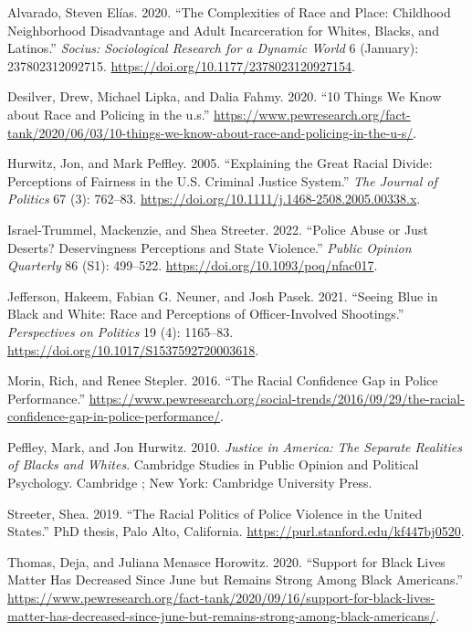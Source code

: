 \documentclass[
  12pt,
]{article}
\newlength{\cslhangindent}
\newlength{\cslentryspacingunit} %
\newenvironment{CSLReferences}[2] %
 {%
  \setlength{\parindent}{0pt}
  \ifodd #1
  \let\oldpar\par
  \def\par{\hangindent=\cslhangindent\oldpar}
  \fi
  \setlength{\parskip}{#2\cslentryspacingunit}
 }%
 {}
\begin{document}
\hypertarget{refs}{}
\begin{CSLReferences}{1}{0}
\leavevmode{}%
Alvarado, Steven Elías. 2020. {``The Complexities of Race and Place:
Childhood Neighborhood Disadvantage and Adult Incarceration for Whites,
Blacks, and Latinos.''} \emph{Socius: Sociological Research for a
Dynamic World} 6 (January): 237802312092715.
\url{https://doi.org/10.1177/2378023120927154}.

\leavevmode{}%
Desilver, Drew, Michael Lipka, and Dalia Fahmy. 2020. {``10 Things We
Know about Race and Policing in the u.s.''}
\url{https://www.pewresearch.org/fact-tank/2020/06/03/10-things-we-know-about-race-and-policing-in-the-u-s/}.

\leavevmode{}%
Hurwitz, Jon, and Mark Peffley. 2005. {``Explaining the Great Racial
Divide: Perceptions of Fairness in the U.S. Criminal Justice System.''}
\emph{The Journal of Politics} 67 (3): 762--83.
\url{https://doi.org/10.1111/j.1468-2508.2005.00338.x}.

\leavevmode{}%
Israel-Trummel, Mackenzie, and Shea Streeter. 2022. {``Police Abuse or
Just Deserts? Deservingness Perceptions and State Violence.''}
\emph{Public Opinion Quarterly} 86 (S1): 499--522.
\url{https://doi.org/10.1093/poq/nfac017}.

\leavevmode{}%
Jefferson, Hakeem, Fabian G. Neuner, and Josh Pasek. 2021. {``Seeing
Blue in Black and White: Race and Perceptions of Officer-Involved
Shootings.''} \emph{Perspectives on Politics} 19 (4): 1165--83.
\url{https://doi.org/10.1017/S1537592720003618}.

\leavevmode{}%
Morin, Rich, and Renee Stepler. 2016. {``The Racial Confidence Gap in
Police Performance.''}
\url{https://www.pewresearch.org/social-trends/2016/09/29/the-racial-confidence-gap-in-police-performance/}.

\leavevmode{}%
Peffley, Mark, and Jon Hurwitz. 2010. \emph{Justice in America: The
Separate Realities of Blacks and Whites}. Cambridge Studies in Public
Opinion and Political Psychology. Cambridge ; New York: Cambridge
University Press.

\leavevmode{}%
Streeter, Shea. 2019. {``The Racial Politics of Police Violence in the
United States.''} PhD thesis, Palo Alto, California.
\url{https://purl.stanford.edu/kf447bj0520}.

\leavevmode{}%
Thomas, Deja, and Juliana Menasce Horowitz. 2020. {``Support for Black
Lives Matter Has Decreased Since June but Remains Strong Among Black
Americans.''}
\url{https://www.pewresearch.org/fact-tank/2020/09/16/support-for-black-lives-matter-has-decreased-since-june-but-remains-strong-among-black-americans/}.

\end{CSLReferences}
\end{document}
